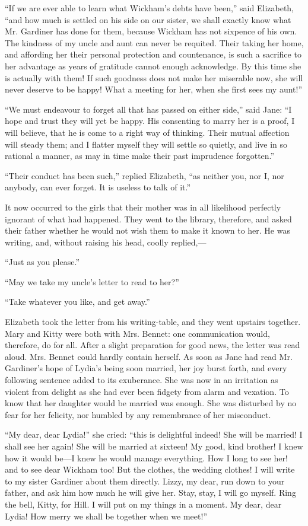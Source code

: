 \documentclass[12pt,openright]{book}
\begin{document}
“If we are ever able to learn what Wickham’s debts have been,” said Elizabeth, “and how much is settled on his side on our sister, we shall exactly know what Mr. Gardiner has done for them, because Wickham has not sixpence of his own. The kindness of my uncle and aunt can never be requited. Their taking her home, and affording her their personal protection and countenance, is such a sacrifice to her advantage as years of gratitude cannot enough acknowledge. By this time she is actually with them! If such goodness does not make her miserable now, she will never deserve to be happy! What a meeting for her, when she first sees my aunt!”

“We must endeavour to forget all that has passed on either side,” said Jane: “I hope and trust they will yet be happy. His consenting to marry her is a proof, I will believe, that he is come to a right way of thinking. Their mutual affection will steady them; and I flatter myself they will settle so quietly, and live in so rational a manner, as may in time make their past imprudence forgotten.”

“Their conduct has been such,” replied Elizabeth, “as neither you, nor I, nor anybody, can ever forget. It is useless to talk of it.”

It now occurred to the girls that their mother was in all likelihood perfectly ignorant of what had happened. They went to the library, therefore, and asked their father whether he would not wish them to make it known to her. He was writing, and, without raising his head, coolly replied,—

“Just as you please.”

“May we take my uncle’s letter to read to her?”

“Take whatever you like, and get away.”

Elizabeth took the letter from his writing-table, and they went upstairs together. Mary and Kitty were both with Mrs. Bennet: one communication would, therefore, do for all. After a slight preparation for good news, the letter was read aloud. Mrs. Bennet could hardly contain herself. As soon as Jane had read Mr. Gardiner’s hope of Lydia’s being soon married, her joy burst forth, and every following sentence added to its exuberance. She was now in an irritation as violent from delight as she had ever been fidgety from alarm and vexation. To know that her daughter would be married was enough. She was disturbed by no fear for her felicity, nor humbled by any remembrance of her misconduct.

“My dear, dear Lydia!” she cried: “this is delightful indeed! She will be married! I shall see her again! She will be married at sixteen! My good, kind brother! I knew how it would be—I knew he would manage everything. How I long to see her! and to see dear Wickham too! But the clothes, the wedding clothes! I will write to my sister Gardiner about them directly. Lizzy, my dear, run down to your father, and ask him how much he will give her. Stay, stay, I will go myself. Ring the bell, Kitty, for Hill. I will put on my things in a moment. My dear, dear Lydia! How merry we shall be together when we meet!”
\end{document}
